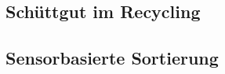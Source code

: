 \chapter{}
\label{sec:state_of_the_art}

\section{Schüttgut im Recycling}
\section{Sensorbasierte Sortierung}


